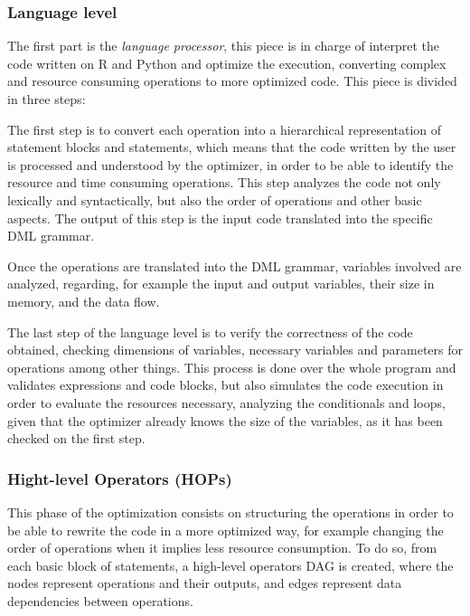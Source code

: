 \documentclass[11pt]{book} %
\begin{document}
      \subsubsection{Language level}

        The first part is the \emph{language processor}, this piece is in charge of interpret the code written on R and Python and optimize the execution, converting complex and resource consuming operations to more optimized code. This piece is divided in three steps:

        The first step is to convert each operation into a hierarchical representation of statement blocks and statements, which means that the code written by the user is processed and understood by the optimizer, in order to be able to identify the resource and time consuming operations. This step analyzes the code not only lexically and syntactically, but also the order of operations and other basic aspects. The output of this step is the input code translated into the specific DML grammar.

        Once the operations are translated into the DML grammar, variables involved are analyzed, regarding, for example the input and output variables, their size in memory, and the data flow.

        The last step of the language level is to verify the correctness of the code obtained, checking dimensions of variables, necessary variables and parameters for operations among other things. This process is done over the whole program and validates expressions and code blocks, but also simulates the code execution in order to evaluate the resources necessary, analyzing the conditionals and loops, given that the optimizer already knows the size of the variables, as it has been checked on the first step.

      \subsubsection{Hight-level Operators (HOPs)}

        This phase of the optimization consists on structuring the operations in order to be able to rewrite the code in a more optimized way, for example changing the order of operations when it implies less resource consumption. To do so, from each basic block of statements, a high-level operators DAG is created, where the nodes represent operations and their outputs, and edges represent data dependencies between operations.
\end{document}

